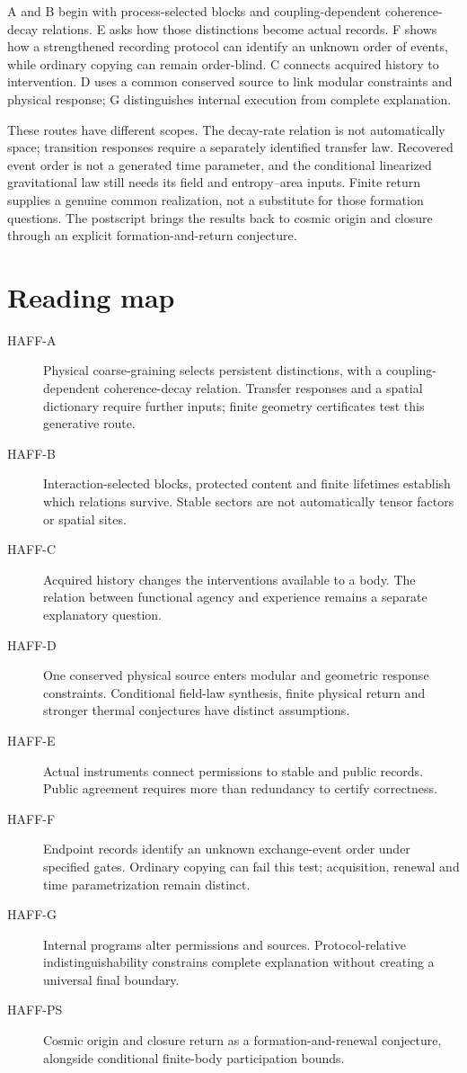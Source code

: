 \documentclass[11pt,a4paper]{article}
\begin{document}
A and B begin with process-selected blocks and coupling-dependent coherence-decay relations. E asks how those distinctions become actual records. F shows how a strengthened recording protocol can identify an unknown order of events, while ordinary copying can remain order-blind. C connects acquired history to intervention. D uses a common conserved source to link modular constraints and physical response; G distinguishes internal execution from complete explanation.

These routes have different scopes. The decay-rate relation is not automatically space; transition responses require a separately identified transfer law. Recovered event order is not a generated time parameter, and the conditional linearized gravitational law still needs its field and entropy--area inputs. Finite return supplies a genuine common realization, not a substitute for those formation questions. The postscript brings the results back to cosmic origin and closure through an explicit formation-and-return conjecture.

\section*{Reading map}
\begin{description}
\item[HAFF-A] Physical coarse-graining selects persistent distinctions, with a coupling-dependent coherence-decay relation. Transfer responses and a spatial dictionary require further inputs; finite geometry certificates test this generative route.
\item[HAFF-B] Interaction-selected blocks, protected content and finite lifetimes establish which relations survive. Stable sectors are not automatically tensor factors or spatial sites.
\item[HAFF-C] Acquired history changes the interventions available to a body. The relation between functional agency and experience remains a separate explanatory question.
\item[HAFF-D] One conserved physical source enters modular and geometric response constraints. Conditional field-law synthesis, finite physical return and stronger thermal conjectures have distinct assumptions.
\item[HAFF-E] Actual instruments connect permissions to stable and public records. Public agreement requires more than redundancy to certify correctness.
\item[HAFF-F] Endpoint records identify an unknown exchange-event order under specified gates. Ordinary copying can fail this test; acquisition, renewal and time parametrization remain distinct.
\item[HAFF-G] Internal programs alter permissions and sources. Protocol-relative indistinguishability constrains complete explanation without creating a universal final boundary.
\item[HAFF-PS] Cosmic origin and closure return as a formation-and-renewal conjecture, alongside conditional finite-body participation bounds.
\end{description}
\end{document}
